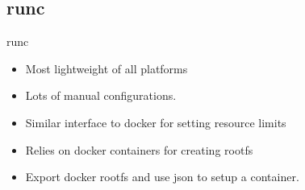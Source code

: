 \subsection{runc}
\begin{frame}[fragile]{runc}

\begin{itemize}
\item\color{cobalt}Most lightweight of all platforms
\item\color{red}Lots of manual configurations.
\item \color{black}Similar interface to docker for setting resource limits
\item Relies on docker containers for creating rootfs
\item Export docker rootfs and use json to setup a container.
\end{itemize}

\end{frame}